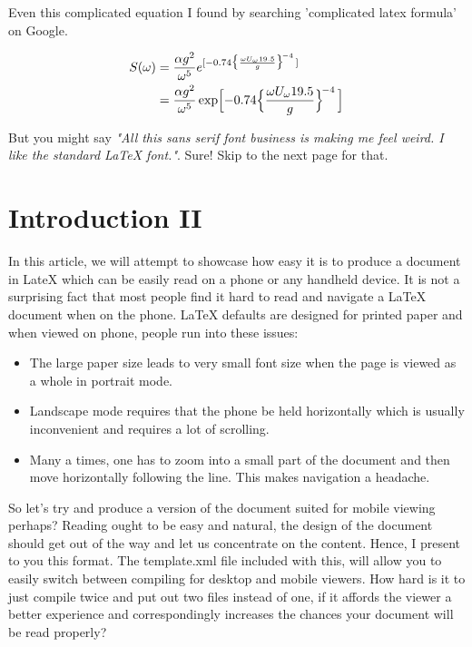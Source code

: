 \documentclass[12pt]{article}
\begin{document}
Even this complicated equation I found by searching 'complicated latex
formula' on Google.

\begin{align*}
	S(\omega)
	&= \frac{\alpha g^2}{\omega^5} e^{[ -0.74\bigl\{\frac{\omega U_\omega 19.5}{g}\bigr\}^{\!-4}\,]} \\
	&= \frac{\alpha g^2}{\omega^5} \exp\Bigl[ -0.74\Bigl\{\frac{\omega U_\omega 19.5}{g}\Bigr\}^{\!-4}\,\Bigr] 
\end{align*}

But you might say \textit{"All this sans serif font business is making me feel
weird. I like the standard LaTeX font."}. Sure! Skip to the next page for that.

\pagebreak

\rmfamily

\section{\textrm{Introduction II}}
In this article, we will attempt to showcase how easy it is to
produce a document in LateX which can be easily read on a phone
or any handheld device. It is not a surprising fact that most
people find it hard to read and navigate a LaTeX document when on
the phone. LaTeX defaults are designed for printed paper and when
viewed on phone, people run into these issues:

\begin{itemize}
	\item The large paper size leads to very small font size when
	the page is viewed as a whole in portrait mode.
	\item Landscape mode requires that the phone be held horizontally
	which is usually inconvenient and requires a lot of scrolling.
	\item Many a times, one has to zoom into a small part of the
	document and then move horizontally following the line. This
	makes navigation a headache.
\end{itemize}

So let's try and produce a version of the document suited for mobile
viewing perhaps? Reading ought to be easy and natural, the design of
the document should get out of the way and let us concentrate on the
content. Hence, I present to you this format. The template.xml file
included with this, will allow you to easily switch between compiling
for desktop and mobile viewers. How hard is it to just compile twice
and put out two files instead of one, if it affords the viewer a
better experience and correspondingly increases the chances your
document will be read properly?
\end{document}
